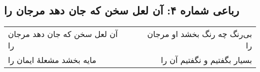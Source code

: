 \begin{center}
\section*{رباعی شماره ۴: آن لعل سخن که جان دهد مرجان را}
\label{sec:0004}
\begin{longtable}{l p{0.5cm} r}
آن لعل سخن که جان دهد مرجان را
&&
بی‌رنگ چه رنگ بخشد او مرجان را
\\
مایه بخشد مشعلهٔ ایمان را
&&
بسیار بگفتیم و نگفتیم آن را
\\
\end{longtable}
\end{center}
